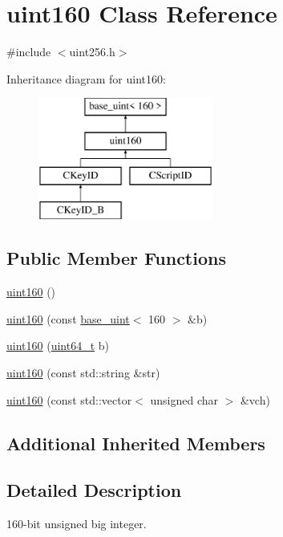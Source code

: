 \hypertarget{classuint160}{}\section{uint160 Class Reference}
\label{classuint160}


{\ttfamily \#include $<$uint256.\+h$>$}

Inheritance diagram for uint160\+:\begin{figure}[H]
\begin{center}
\leavevmode
\includegraphics[height=4.000000cm]{classuint160}
\end{center}
\end{figure}
\subsection*{Public Member Functions}
\begin{DoxyCompactItemize}
\item 
\hyperlink{classuint160_a66918f25b891415f2a9bbbb1dfdbedbd}{uint160} ()
\item 
\hyperlink{classuint160_ae0ba03a9f6b06af48b44963b3d32c2bd}{uint160} (const \hyperlink{classbase__uint}{base\+\_\+uint}$<$ 160 $>$ \&b)
\item 
\hyperlink{classuint160_a1b4399cc586066b0c61401921be5d041}{uint160} (\hyperlink{stdint_8h_aaa5d1cd013383c889537491c3cfd9aad}{uint64\+\_\+t} b)
\item 
\hyperlink{classuint160_a17be565c999f678e47d12e694446e0c4}{uint160} (const std\+::string \&str)
\item 
\hyperlink{classuint160_a92bd85c77e73d6642f9bb7519cbd480c}{uint160} (const std\+::vector$<$ unsigned char $>$ \&vch)
\end{DoxyCompactItemize}
\subsection*{Additional Inherited Members}


\subsection{Detailed Description}
160-\/bit unsigned big integer. 


